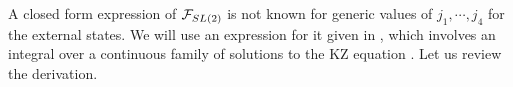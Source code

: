 A closed form expression of ${\cal F}_{SL(2)}$ is not known for generic
values of $j_1, \cdots , j_4$
 for the external states. We will use an expression
for it given in \teschnersecond, which involves an integral
over a continuous family of solutions to the KZ equation \kzequation.
Let us review the derivation.
%
%
%
%
